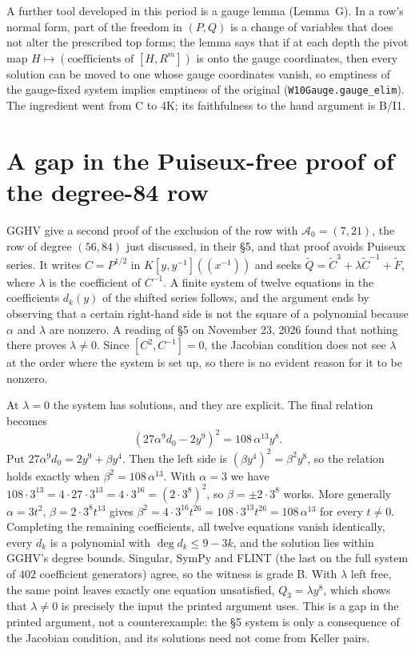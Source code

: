 \documentclass[a4paper,11pt]{article}
\theoremstyle{jsplain}
\theoremstyle{jsdef}
\theoremstyle{jsrem}
\begin{document}
A further tool developed in this period is a gauge lemma (Lemma~G). In a row's normal form, part of the freedom in $(P,Q)$ is a change of variables that does not alter the prescribed top forms; the lemma says that if at each depth the pivot map $H\mapsto(\text{coefficients of }[H,R^m])$ is onto the gauge coordinates, then every solution can be moved to one whose gauge coordinates vanish, so emptiness of the gauge-fixed system implies emptiness of the original (\texttt{W10Gauge.\allowbreak{}gauge\_\allowbreak{}elim}). The ingredient went from C to 4K; its faithfulness to the hand argument is B/I1.

\section{A gap in the Puiseux-free proof of the degree-84 row}\label{rp:sec:lambda}

GGHV give a second proof of the exclusion of the row with $\mathcal A_0=(7,21)$, the row of degree $(56,84)$ just discussed, in their \S5, and that proof avoids Puiseux series. It writes $C=P^{1/2}$ in $K[y,y^{-1}]((x^{-1}))$ and seeks $\tilde Q=\tilde C^3+\lambda\tilde C^{-1}+\tilde F$, where $\lambda$ is the coefficient of $C^{-1}$. A finite system of twelve equations in the coefficients $d_k(y)$ of the shifted series follows, and the argument ends by observing that a certain right-hand side is not the square of a polynomial because $\alpha$ and $\lambda$ are nonzero. A reading of \S5 on November 23, 2026 found that nothing there proves $\lambda\ne0$. Since $[C^2,C^{-1}]=0$, the Jacobian condition does not see $\lambda$ at the order where the system is set up, so there is no evident reason for it to be nonzero.

At $\lambda=0$ the system has solutions, and they are explicit. The final relation becomes
\[
(27\alpha^9d_0-2y^9)^2=108\,\alpha^{13}y^8 .
\]
Put $27\alpha^9d_0=2y^9+\beta y^4$. Then the left side is $(\beta y^4)^2=\beta^2y^8$, so the relation holds exactly when $\beta^2=108\,\alpha^{13}$. With $\alpha=3$ we have $108\cdot3^{13}=4\cdot27\cdot3^{13}=4\cdot3^{16}=(2\cdot3^8)^2$, so $\beta=\pm2\cdot3^8$ works. More generally $\alpha=3t^2$, $\beta=2\cdot3^8t^{13}$ gives $\beta^2=4\cdot3^{16}t^{26}=108\cdot3^{13}t^{26}=108\,\alpha^{13}$ for every $t\ne0$. Completing the remaining coefficients, all twelve equations vanish identically, every $d_k$ is a polynomial with $\deg d_k\le9-3k$, and the solution lies within GGHV's degree bounds. Singular, SymPy and FLINT (the last on the full system of $402$ coefficient generators) agree, so the witness is grade B. With $\lambda$ left free, the same point leaves exactly one equation unsatisfied, $Q_3=\lambda y^8$, which shows that $\lambda\ne0$ is precisely the input the printed argument uses. This is a gap in the printed argument, not a counterexample: the \S5 system is only a consequence of the Jacobian condition, and its solutions need not come from Keller pairs.
\end{document}
